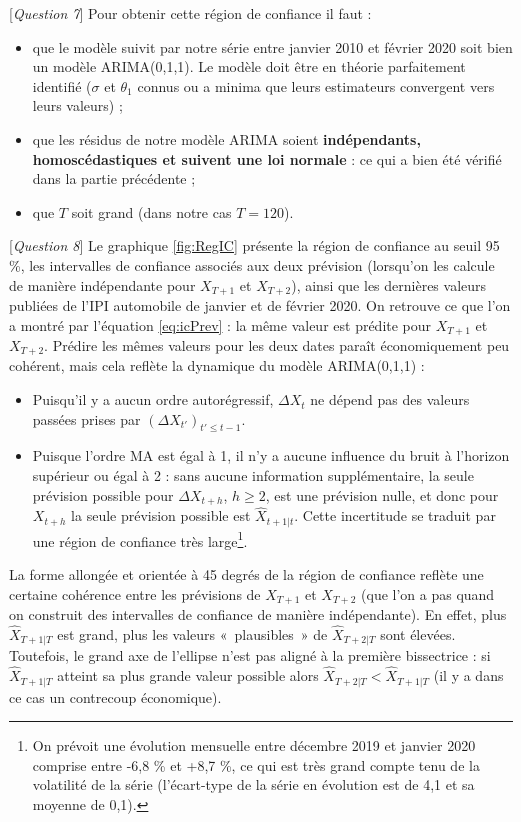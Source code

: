 \documentclass[french]{article}
\providecommand{\tightlist}{%
  \setlength{\itemsep}{0pt}\setlength{\parskip}{0pt}}
\let\rmarkdownfootnote\footnote%
\def\footnote{\protect\rmarkdownfootnote}
\begin{document}
{[}\emph{Question 7}{]} Pour obtenir cette région de confiance il faut :

\begin{itemize}
\tightlist
\item
  que le modèle suivit par notre série entre janvier 2010 et février 2020 soit bien un modèle ARIMA(0,1,1). Le modèle doit être en théorie parfaitement identifié (\(\sigma\) et \(\theta_1\) connus ou a minima que leurs estimateurs convergent vers leurs valeurs) ;
\item
  que les résidus de notre modèle ARIMA soient \textbf{indépendants, homoscédastiques et suivent une loi normale} : ce qui a bien été vérifié dans la partie précédente ;
\item
  que \(T\) soit grand (dans notre cas \(T=120\)).
\end{itemize}

{[}\emph{Question 8}{]} Le graphique \ref{fig:RegIC} présente la région de confiance au seuil 95 \%, les intervalles de confiance associés aux deux prévision (lorsqu'on les calcule de manière indépendante pour \(X_{T+1}\) et \(X_{T+2}\)), ainsi que les dernières valeurs publiées de l'IPI automobile de janvier et de février 2020.
On retrouve ce que l'on a montré par l'équation \eqref{eq:icPrev} : la même valeur est prédite pour \(X_{T+1}\) et \(X_{T+2}\).
Prédire les mêmes valeurs pour les deux dates paraît économiquement peu cohérent, mais cela reflète la dynamique du modèle ARIMA(0,1,1) :

\begin{itemize}
\item
  Puisqu'il y a aucun ordre autorégressif, \(\Delta X_t\) ne dépend pas des valeurs passées prises par \((\Delta X_{t'})_{t'\leq t-1}\).
\item
  Puisque l'ordre MA est égal à 1, il n'y a aucune influence du bruit à l'horizon supérieur ou égal à 2 : sans aucune information supplémentaire, la seule prévision possible pour \(\Delta X_{t+h}\), \(h\geq 2\), est une prévision nulle, et donc pour \(X_{t+h}\) la seule prévision possible est \(\widehat X_{t+1\vert t}\).
  Cette incertitude se traduit par une région de confiance très large\footnote{On prévoit une évolution mensuelle entre décembre 2019 et janvier 2020 comprise entre -6,8 \% et +8,7 \%, ce qui est très grand compte tenu de la volatilité de la série (l'écart-type de la série en évolution est de 4,1 et sa moyenne de 0,1).}.
\end{itemize}

La forme allongée et orientée à 45 degrés de la région de confiance reflète une certaine cohérence entre les prévisions de \(X_{T+1}\) et \(X_{T+2}\) (que l'on a pas quand on construit des intervalles de confiance de manière indépendante).
En effet, plus \(\widehat X_{T+1\vert T}\) est grand, plus les valeurs «~plausibles~» de \(\widehat X_{T+2\vert T}\) sont élevées.
Toutefois, le grand axe de l'ellipse n'est pas aligné à la première bissectrice : si \(\widehat X_{T+1\vert T}\) atteint sa plus grande valeur possible alors \(\widehat X_{T+2\vert T}<\widehat X_{T+1\vert T}\) (il y a dans ce cas un contrecoup économique).
\end{document}
